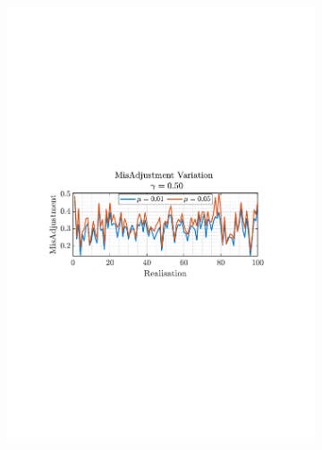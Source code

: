 \documentclass[12pt]{article}
\numberwithin{equation}{section}
\begin{document}
\begin{figure}[H]
				\begin{subfigure}{0.49\textwidth}
					\centering
					\includegraphics[trim={2.2cm 11.2cm 3.00cm  11.2cm}, clip, width=\textwidth]{../MATLAB/figures/q2_1f_fig04.pdf} 
					\captionsetup{justification=centering}
				\end{subfigure}
				\begin{subfigure}{0.49\textwidth}
					\centering

\end{subfigure}
\end{figure}
\end{document}
